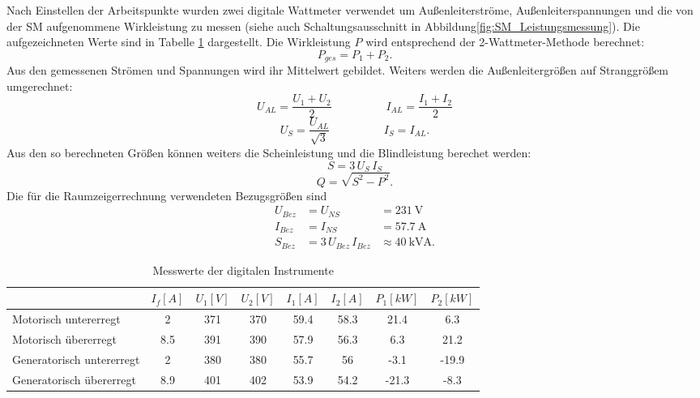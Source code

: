 \noindent Nach Einstellen der Arbeitspunkte wurden zwei digitale Wattmeter verwendet um Außenleiterströme, Außenleiterspannungen und die von der SM aufgenommene Wirkleistung zu messen (siehe auch Schaltungsausschnitt in Abbildung\;\ref{fig:SM_Leistungsmessung}). Die aufgezeichneten Werte sind in Tabelle \ref{tab:betrzustaende_digitale_messungen} dargestellt. Die Wirkleistung $P$ wird entsprechend der 2-Wattmeter-Methode berechnet:
\begin{equation*}
    P_{ges}=P_1+P_2.
\end{equation*}
Aus den gemessenen Strömen und Spannungen wird ihr Mittelwert gebildet. Weiters werden die Außenleitergrößen auf Stranggrößem umgerechnet:
\begin{equation*}
    U_{AL}=\frac{U_1+U_2}{2}\hspace{2cm}
    I_{AL}=\frac{I_1+I_2}{2}
\end{equation*}
\begin{equation*}
    U_{S}=\frac{U_{AL}}{\sqrt{3}}\hspace{2cm}
    I_{S}=I_{AL}.
\end{equation*}
Aus den so berechneten Größen können weiters die Scheinleistung und die Blindleistung berechet werden:
\begin{equation*}
    S=3\,U_S\,I_S
\end{equation*}
\begin{equation*}
    Q=\sqrt{S^2-P^2}.
\end{equation*}
Die für die Raumzeigerrechnung verwendeten Bezugsgrößen sind 
\begin{align*}
    U_{Bez} &= U_{NS} &= \SI{231}{\volt}\\
    I_{Bez} &= I_{NS} &= \SI{57.7}{\ampere}\\
    S_{Bez} &= 3\,U_{Bez}\,I_{Bez} &\approx \SI{40}{\kilo\volt\ampere}.
\end{align*}
\begin{table}[!ht]
\centering
\begin{tabular}{|l|c|c|c|c|c|c|c|}
\hline
                          & $I_f [A]$ & $U_1 [V]$ & $U_2 [V]$ & $I_1 [A]$ & $I_2 [A]$ & $P_1 [kW]$ & $P_2 [kW]$ \\ \hline
Motorisch untererregt     & 2         & 371       & 370       & 59.4      & 58.3      & 21.4       & 6.3        \\ \hline
Motorisch übererregt      & 8.5       & 391       & 390       & 57.9      & 56.3      & 6.3        & 21.2       \\ \hline
Generatorisch untererregt & 2         & 380       & 380       & 55.7      & 56        & -3.1       & -19.9      \\ \hline
Generatorisch übererregt  & 8.9       & 401       & 402       & 53.9      & 54.2      & -21.3      & -8.3       \\ \hline
\end{tabular}
\caption{Messwerte der digitalen Instrumente}
\label{tab:betrzustaende_digitale_messungen}
\end{table}


